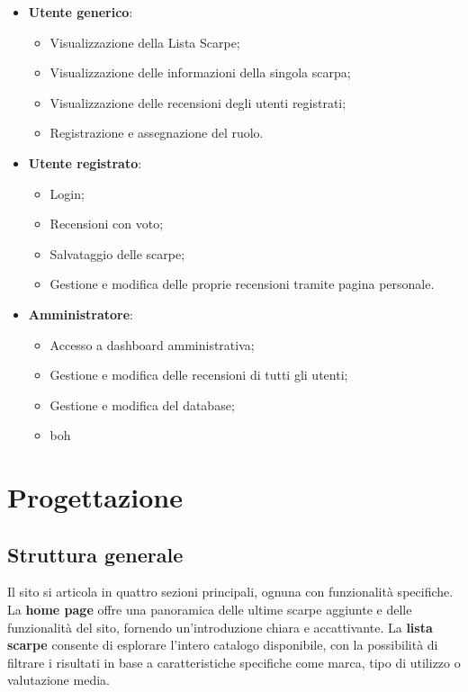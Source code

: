 \documentclass[a4paper, 12pt]{article}
\begin{document}
\begin{justify}
\begin{itemize}
    \item \textbf{Utente generico}:
        \begin{itemize}
            \item Visualizzazione della Lista Scarpe;
            \item Visualizzazione delle informazioni della singola scarpa;
            \item Visualizzazione delle recensioni degli utenti registrati;
            \item Registrazione e assegnazione del ruolo.
        \end{itemize}
    \item \textbf{Utente registrato}:
        \begin{itemize}
            \item Login;
            \item Recensioni con voto;
            \item Salvataggio delle scarpe;
            \item Gestione e modifica delle proprie recensioni tramite pagina personale.
        \end{itemize}
    \item \textbf{Amministratore}:
        \begin{itemize}
            \item Accesso a dashboard amministrativa;
            \item Gestione e modifica delle recensioni di tutti gli utenti;
            \item Gestione e modifica del database;
            \item boh
        \end{itemize}
\end{itemize}


\section{Progettazione}

\subsection{Struttura generale}

Il sito si articola in quattro sezioni principali, ognuna con funzionalità specifiche. La \textbf{home page} offre una panoramica delle ultime scarpe aggiunte e delle funzionalità del sito, fornendo un'introduzione chiara e accattivante. La \textbf{lista scarpe} consente di esplorare l'intero catalogo disponibile, con la possibilità di filtrare i risultati in base a caratteristiche specifiche come marca, tipo di utilizzo o valutazione media.


\end{justify}
\end{document}
